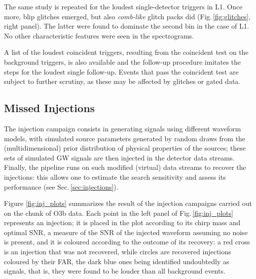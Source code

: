 \documentclass[binding=0.6cm, LaM]{sapthesis}
\begin{document}
	The same study is repeated for the loudest single-detector triggers in L1.
	Once more, blip glitches emerged, but also {\it comb-like} glitch packs did (Fig.\,\ref{fig:glitches}, right panel).
        The latter were found to dominate the second bin in the case of L1.
	No other characteristic features were seen in the spectrograms.
	
	A list of the loudest coincident triggers, resulting from the coincident test on the background triggers, 	
	is also available and the follow-up procedure imitates the steps for the loudest single follow-up.
	Events that pass the coincident test are subject to further scrutiny, 
	as these may be affected by glitches or gated data.

\subsection{Missed Injections}
 	The injection campaign consists in generating signals using different waveform models,
        with simulated source parameters generated by random draws from the (multidimensional) prior distribution of physical properties of the sources;
        these sets of simulated GW signals are then injected in the detector data streams.
        Finally, the pipeline runs on such modified (virtual) data streams to recover the injections: 
	this allows one to estimate the search sensitivity and assess its performance (see Sec.\,\ref{sec:injections}).

        Figure \ref{fig:inj_plots} summarizes the result of the injection campaigns carried out on the chunk of O3b data.
        Each point in the left panel of Fig.\,\ref{fig:inj_plots} represents an injection;
        it is placed in the plot according to its chirp mass and optimal SNR,
        a measure of the SNR of the injected waveform assuming no noise is present,
        and it is coloured according to the outcome of its recovery:
        a red cross is an injection that was not recovered,
        while circles are recovered injections coloured by their FAR,
        the dark blue ones being identified undoubtedly as signals, that is,
        they were found to be louder than all background events.
\end{document}

